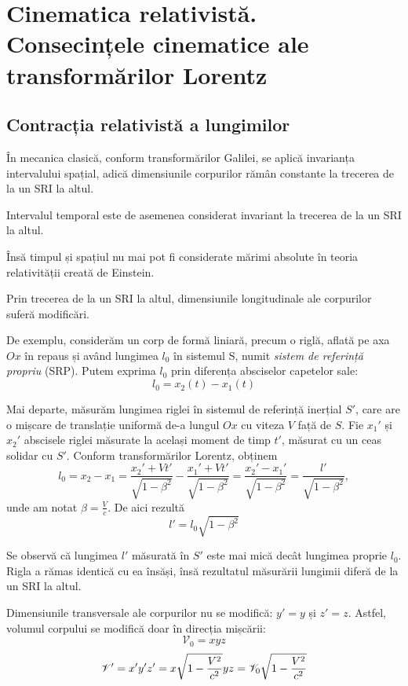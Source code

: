 \section{Cinematica relativistă. Consecințele cinematice ale transformărilor Lorentz}

\subsection{Contracția relativistă a lungimilor}

În mecanica clasică, conform transformărilor Galilei, se aplică invarianța
intervalului spațial, adică dimensiunile corpurilor rămân constante la
trecerea de la un SRI la altul.

Intervalul temporal este de asemenea considerat invariant la trecerea
de la un SRI la altul.

Însă timpul și spațiul nu mai pot fi considerate mărimi absolute în teoria
relativității creată de Einstein.

Prin trecerea de la un SRI la altul, dimensiunile longitudinale ale corpurilor
suferă modificări.

\parbreak

De exemplu, considerăm un corp de formă liniară, precum o riglă, aflată pe axa
$Ox$ în repaus și având lungimea $l_0$ în sistemul S, numit
\emph{sistem de referință propriu} (SRP). Putem exprima $l_0$ prin diferența
absciselor capetelor sale:
\[ l_0 = x_2(t) - x_1(t) \]

\newcommand{\betalorentzradical}{\sqrt{1 - \beta^2}}

Mai departe, măsurăm lungimea riglei în sistemul de referință inerțial $S'$,
care are o mișcare de translație uniformă de-a lungul $Ox$ cu viteza $V$ față de $S$.
Fie $x_1'$ și $x_2'$ abscisele riglei măsurate la același moment de timp $t'$,
măsurat cu un ceas solidar cu $S'$. Conform transformărilor Lorentz, obținem
\[
    l_0 = x_2 - x_1
    = \frac{x_2' + Vt'}{\betalorentzradical} - \frac{x_1' + Vt'}{\betalorentzradical}
    = \frac{x_2' - x_1'}{\betalorentzradical} = \frac{l'}{\betalorentzradical},
\]
unde am notat \( \beta = \frac{V}{c} \). De aici rezultă
\[ l' = l_0 \betalorentzradical \]

Se observă că lungimea $l'$ măsurată în $S'$ este mai mică decât lungimea
proprie $l_0$. Rigla a rămas identică cu ea însăși, însă rezultatul măsurării
lungimii diferă de la un SRI la altul.

\parbreak

Dimensiunile transversale ale corpurilor nu se modifică: \( y' = y \) și \( z' = z \).
Astfel, volumul corpului se modifică doar în direcția mișcării:
\[ \mathscr{V}_0 = xyz \]
\[ \mathscr{V}' = x'y'z' = x\sqrt{1 - \frac{V^2}{c^2}} yz = \mathscr{V}_0 \sqrt{1 - \frac{V^2}{c^2}} \]

